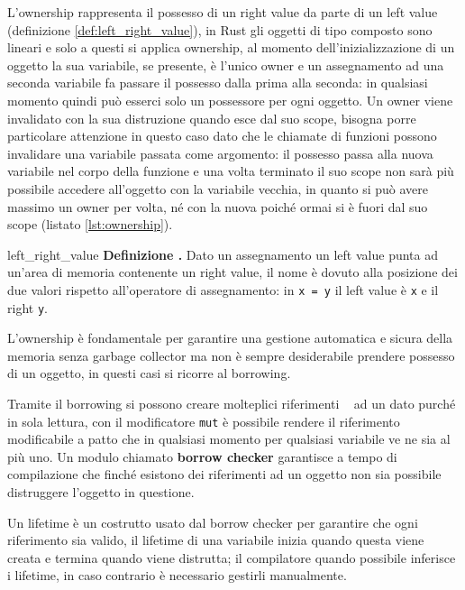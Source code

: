 \documentclass[Lau,binding=0.6cm]{sapthesis}
\newenvironment{myDefinition}[2]{ \begin{Definizione}[adjusted title=#1]{}{#2}
    \textbf{Definizione \thetcbcounter.} }{\end{Definizione}}
\newcommand{\textcode}[1]{\colorbox{backcolour}{\texttt{#1}}}
\begin{document}
L'ownership rappresenta il possesso di un right value da parte di un left value (definizione \ref{def:left_right_value}), in Rust gli oggetti di tipo composto sono lineari e solo a questi si applica ownership, al momento dell'inizializzazione di un oggetto la sua variabile, se presente, è l'unico owner e un assegnamento ad una seconda variabile fa passare il possesso dalla prima alla seconda: in qualsiasi momento quindi può esserci solo un possessore per ogni oggetto. 
Un owner viene invalidato con la sua distruzione quando esce dal suo scope, bisogna porre particolare attenzione in questo caso dato che le chiamate di funzioni possono invalidare una variabile passata come argomento: il possesso passa alla nuova variabile nel corpo della funzione e una volta terminato il suo scope non sarà più possibile accedere all'oggetto con la variabile vecchia, in quanto si può avere massimo un owner per volta, né con la nuova poiché ormai si è fuori dal suo scope (listato \ref{lst:ownership}). 



\begin{myDefinition}{Left e Right value}{left_right_value}
    Dato un assegnamento un left value punta ad un'area di memoria contenente un right value, il nome è dovuto alla posizione dei due valori rispetto all'operatore di assegnamento: in \textcode{x = y} il left value è \textcode{x} e il right \textcode{y}.
\end{myDefinition}

L'ownership è fondamentale per garantire una gestione automatica e sicura della memoria senza garbage collector ma non è sempre desiderabile prendere possesso di un oggetto, in questi casi si ricorre al borrowing.

Tramite il borrowing si possono creare molteplici  riferimenti ~\cite[4.2]{rust:language} ad un dato purché in sola lettura, con il modificatore \textcode{mut} è possibile rendere il riferimento modificabile a patto che in qualsiasi momento per qualsiasi variabile ve ne sia al più uno. 
Un modulo chiamato \textbf{borrow checker} garantisce a tempo di compilazione che finché esistono dei riferimenti ad un oggetto non sia possibile distruggere l'oggetto in questione. 



Un lifetime è un costrutto usato dal borrow checker per garantire che ogni riferimento sia valido, il lifetime di una variabile inizia quando questa viene creata e termina quando viene distrutta; il compilatore quando possibile inferisce i lifetime, in caso contrario è necessario gestirli manualmente.
\end{document}
